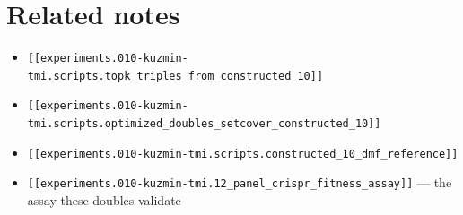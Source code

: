\section{Related notes}

\begin{itemize}
  \item \texttt{[[experiments.010-kuzmin-tmi.scripts.topk\_triples\_from\_constructed\_10]]}
  \item \texttt{[[experiments.010-kuzmin-tmi.scripts.optimized\_doubles\_setcover\_constructed\_10]]}
  \item \texttt{[[experiments.010-kuzmin-tmi.scripts.constructed\_10\_dmf\_reference]]}
  \item \texttt{[[experiments.010-kuzmin-tmi.12\_panel\_crispr\_fitness\_assay]]} --- the assay
        these doubles validate
\end{itemize}
